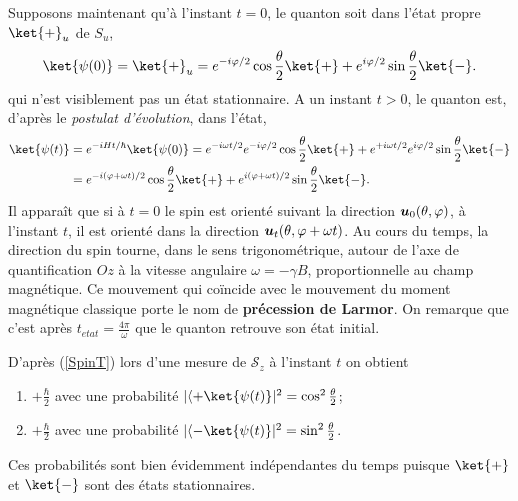 Supposons maintenant qu'à l'instant $t=0$, le quanton soit dans l'état propre
$\ket{+}_{u}$ de $S_{u}$,%
\begin{equation}
\ket{\psi(0)}=\ket{+}_{u}=e^{-i\varphi/2}\cos\frac{\theta}{2}\ket{+}
+e^{i\varphi/2}\sin\frac{\theta}{2}\ket{-}.
\end{equation}
qui n'est visiblement pas un état stationnaire. A un instant $t>0$, le quanton
est, d'après le \emph{postulat d'évolution}, dans l'état,
\begin{equation}%
\label{SpinT}%
\begin{split}
\ket{\psi(t)}&  =e^{-iHt/\hbar}\ket{\psi(0)}=e^{-i\omega t/2}e^{-i\varphi/2}\cos
\frac{\theta}{2}\ket{+}+e^{+i\omega t/2}e^{i\varphi/2}\sin\frac{\theta}{2}
\ket{-}\\
&  =e^{-i(\varphi+\omega t) /2}\cos\frac{\theta}{2}\ket{+} +e^{i(\varphi+\omega
t) /2}\sin\frac{\theta}{2}\ket{-}.
\end{split}
\end{equation}%
Il apparaît que si à $t=0$ le spin est orienté suivant la direction
$\boldsymbol{u}_0(\theta,\varphi)$, à l'instant $t$, il est orienté dans la
direction $\boldsymbol{u} _{t}(\theta,\varphi+\omega t)$. Au cours du temps, la
direction du spin tourne, dans le sens trigonométrique, autour de l'axe de
quantification $Oz$ à la vitesse angulaire $\omega=-\gamma B$, proportionnelle
au champ magnétique. Ce mouvement qui coïncide avec le mouvement du moment
magnétique classique porte le nom de \textbf{précession de Larmor}. On remarque
que c'est après $t_{etat}=\frac{4\pi}{\omega}$ que le quanton retrouve son état
initial.

D'après (\ref{SpinT}) lors d'une mesure de $\mathcal{S}_z$ à l'instant $t$
on obtient

\begin{enumerate}
\item $+\frac{\hbar}{2}$ avec une probabilité $|\langle +\ket{\psi(t)}|^{2}
=\cos^{2}\frac{\theta}{2}$;

\item $+\frac{\hbar}{2}$ avec une probabilité $|\langle -\ket{\psi(t)}|^{2}
=\sin^{2}\frac{\theta}{2}$.
\end{enumerate}

Ces probabilités sont bien évidemment indépendantes du temps puisque
$\ket{+}$ et $\ket{-}$ sont des états stationnaires.

